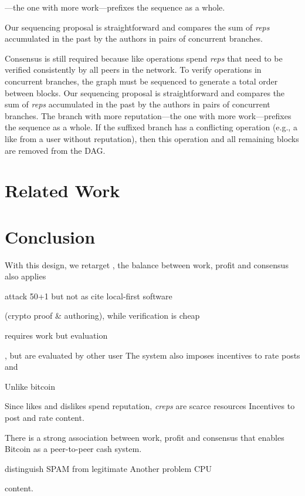 \documentclass[10pt,journal,compsoc]{IEEEtran}
\newcommand{\reps} {\emph{reps}\xspace}
\begin{document}
---the one with more work---prefixes the
sequence as a whole.

Our sequencing proposal is straightforward and compares the sum of \reps
accumulated in the past by the authors in pairs of concurrent branches.

Consensus is still required because like operations spend \reps that need
to be verified consistently by all peers in the network.
To verify operations in concurrent branches, the graph must be sequenced to
generate a total order between blocks.
Our sequencing proposal is straightforward and compares the sum of \reps
accumulated in the past by the authors in pairs of concurrent branches.
The branch with more reputation---the one with more work---prefixes the
sequence as a whole.
If the suffixed branch has a conflicting operation (e.g., a like from a user
without reputation), then this operation and all remaining blocks are removed
from the DAG.

\section{Related Work}
\label{sec.related}

\section{Conclusion}
\label{sec.conclusion}



With this design, we retarget  , the balance between work, profit and consensus also applies 

attack 50+1 but not as
cite local-first software

 (crypto proof \& authoring),
while verification is cheap


requires work but evaluation


, but
are evaluated by other user
The system also imposes incentives to rate posts and 

Unlike bitcoin

Since likes and dislikes spend reputation, \emph{creps} are scarce resources
Incentives to post and rate content.

There is a strong association between work, profit and consensus that enables
Bitcoin as a peer-to-peer cash system.

distinguish SPAM from legitimate
Another problem CPU



content.
\end{document}
